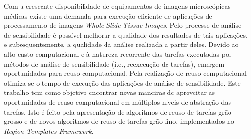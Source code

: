 Com a crescente disponibilidade de equipamentos de imagens microscópicas médicas \mbox{existe} uma demanda para execução eficiente de aplicações de processamento de imagens \textit{Whole Slide Tissue Images}. Pelo processo de análise de sensibilidade é possível melhorar a qualidade dos resultados de tais aplicações, e subsequentemente, a qualidade da análise realizada a partir deles. Devido ao alto custo computacional e à natureza recorrente das tarefas executadas por métodos de análise de sensibilidade (i.e., reexecução de tarefas), emergem oportunidades para reuso computacional. Pela realização de reuso computacional otimiza-se o tempo de execução das aplicações de análise de sensibilidade. Este trabalho tem como objetivo encontrar novas maneiras de aproveitar as oportunidades de reuso computacional em múltiplos níveis de abstração das tarefas. Isto é feito pela apresentação de algoritmos de reuso de tarefas grão-grosso e de novos algoritmos de reuso de tarefas grão-fino, implementados no \textit{Region Templates Framework}.